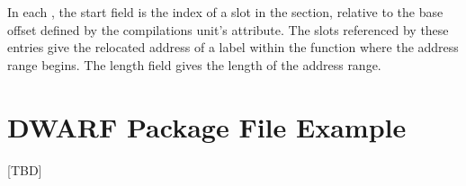 In each \DWLLEstartlengthentry{}, the start field is the index
of a slot in the \dotdebugaddr{} section, relative to the base
offset defined by the compilations unit's \DWATaddrbase{}
attribute. The \dotdebugaddr{} slots referenced by these entries give
the relocated address of a label within the function where the
address range begins. The length field gives the length of the
address range.

\clearpage
\section{DWARF Package File Example}
\label{app:dwarfpackagefileexample}
[TBD]
